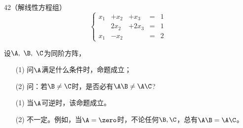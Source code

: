 \begin{frame}
  \begin{footnotesize}
    \begin{exampleblock}{42（解线性方程组）}     
      $$
      \left\{
      \begin{array}{rrrcr}
        x_1&+x_2&+x_3&=&1\\
           &2x_2&+2x_3&=&1\\
        x_1&-x_2&&=&2
      \end{array}
      \right.
      $$
    \end{exampleblock}
  \end{footnotesize}
\end{frame}



\begin{frame}
  \begin{footnotesize}
    \begin{exampleblock}{43}
      设$\A,~\B,~\C$为同阶方阵，
      \begin{itemize}
      \item[(1)]问$\A$满足什么条件时，命题\blue{$\A\B=\A\C~\Rightarrow~\B=\C$}成立；\\[0.05in]
      \item[(2)] 问：若$\B\ne\C$时，是否必有$\A\B\ne\A\C$?
      \end{itemize}
    \end{exampleblock}
    
    \begin{itemize}
    \item[(1)]
      当$\A$可逆时，该命题成立。
    \item[(2)]
      不一定。例如，当$\A=\zero$时，不论任何$\B,\C$，总有$\A\B=\A\C$。

    \end{itemize}

  \end{footnotesize}
\end{frame}


